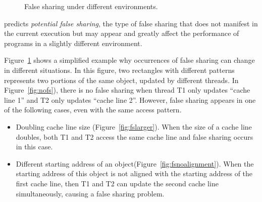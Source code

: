 \begin{figure}
\begin{center} 
%
\hspace{10pt}
%
\hspace{10pt}
%
\end{center}
\caption{False sharing under different environments.}
\label{fig:potentialfalsesharing}
\end{figure}

\Predator{} predicts {\it potential false sharing}, the type of false sharing that does not manifest in the current execution but may appear and greatly affect the performance of programs in a slightly different environment.

Figure~\ref{fig:potentialfalsesharing} shows a simplified example why occurrences of false sharing can change in different situations. 
In this figure, two rectangles with different patterns
represents two portions of the same object, updated by different threads. In Figure~\ref{fig:nofs}), there is no false sharing when thread T1 only updates 
``cache line 1'' and T2 only updates ``cache line 2''.
However, false sharing appears in one of the following cases, even with the same
access pattern. 

\begin{itemize}
\item
Doubling cache line size (Figure~\ref{fig:fslarger}). When the size of a cache line doubles, both T1 and T2 access the same cache line and false sharing occurs in this case.

\item
Different starting address of an object(Figure~\ref{fig:fsnoalignment}).  
When the starting address of this object is not aligned with the starting address of 
the first cache line, 
then T1 and T2 can update the second cache line simultaneously, 
causing a false sharing problem. 
\end{itemize} 

